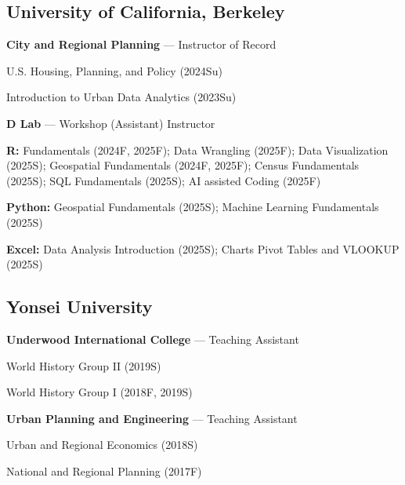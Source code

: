 \documentclass[11pt,letterpaper]{article}
\newcommand{\term}[1]{(#1)}
\begin{document}
\subsection*{University of California, Berkeley}
\begin{subpoints}
  \item \textbf{City and Regional Planning} — Instructor of Record
    \begin{subpoints2}
      \item U.S. Housing, Planning, and Policy \term{2024Su}
      \item Introduction to Urban Data Analytics \term{2023Su}
    \end{subpoints2}
  \item \textbf{D Lab} — Workshop (Assistant) Instructor
    \begin{subpoints2}
      \item \textbf{R:} Fundamentals \term{2024F, 2025F}; Data Wrangling \term{2025F}; Data Visualization \term{2025S}; Geospatial Fundamentals \term{2024F, 2025F}; Census Fundamentals \term{2025S}; SQL Fundamentals \term{2025S}; AI assisted Coding \term{2025F}
      \item \textbf{Python:} Geospatial Fundamentals \term{2025S}; Machine Learning Fundamentals \term{2025S}
      \item \textbf{Excel:} Data Analysis Introduction \term{2025S}; Charts Pivot Tables and VLOOKUP \term{2025S}
    \end{subpoints2}
\end{subpoints}

\subsection*{Yonsei University}
\begin{subpoints}
  \item \textbf{Underwood International College} — Teaching Assistant
    \begin{subpoints2}
      \item World History Group II \term{2019S}
      \item World History Group I \term{2018F, 2019S}
    \end{subpoints2}
  \item \textbf{Urban Planning and Engineering} — Teaching Assistant
    \begin{subpoints2}
      \item Urban and Regional Economics \term{2018S}
      \item National and Regional Planning \term{2017F}
    \end{subpoints2}
\end{subpoints}
\end{document}
